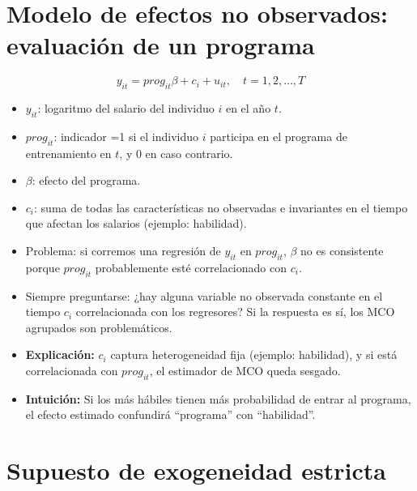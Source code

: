 \documentclass[12pt]{article}
\begin{document}
\section*{\noindent\textbf{Modelo de efectos no observados: evaluación de un programa}}

\[
y_{it} = prog_{it} \beta + c_i + u_{it}, \quad t=1,2,\ldots,T
\]

\begin{itemize}
    \item $y_{it}$: logaritmo del salario del individuo $i$ en el año $t$.
    \item $prog_{it}$: indicador =1 si el individuo $i$ participa en el programa de entrenamiento en $t$, y 0 en caso contrario.
    \item $\beta$: efecto del programa.
    \item $c_i$: suma de todas las características no observadas e invariantes en el tiempo que afectan los salarios (ejemplo: habilidad).
    \item Problema: si corremos una regresión de $y_{it}$ en $prog_{it}$, 
    $\beta$ no es consistente porque $prog_{it}$ probablemente esté correlacionado con $c_i$.
    \item Siempre preguntarse: ¿hay alguna variable no observada constante en el tiempo $c_i$ 
    correlacionada con los regresores?  
    Si la respuesta es sí, los MCO agrupados son problemáticos.
\end{itemize}

\begin{itemize}
    \item \textbf{Explicación:} $c_i$ captura heterogeneidad fija (ejemplo: habilidad), y si está correlacionada con $prog_{it}$, el estimador de MCO queda sesgado.
    \item \textbf{Intuición:} Si los más hábiles tienen más probabilidad de entrar al programa, 
    el efecto estimado confundirá “programa” con “habilidad”.
\end{itemize}

\section*{\noindent\textbf{Supuesto de exogeneidad estricta}}
\end{document}
